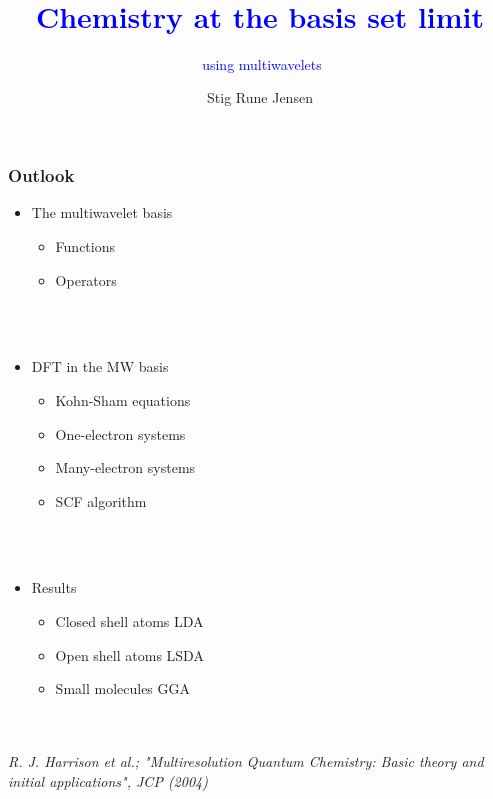 \documentclass[slides]{beamer}
\title{$\;$\\$\;$\\$\;$\\$\;$\\\textcolor{blue}
							{Chemistry at the basis set limit}}
\subtitle{$\;$\textcolor{blue}
							{using multiwavelets}}
\author{Stig Rune Jensen}
\begin{document}
\footnotesize

{
\maketitle
}

\begin{frame}
	\frametitle{Outlook}
	\begin{itemize}
		\item The multiwavelet basis
		\begin{itemize}
			\scriptsize
			\item Functions
			\item Operators
		\end{itemize}
		\ \\
		\ \\
		\item DFT in the MW basis
		\begin{itemize}
			\scriptsize
			\item Kohn-Sham equations
			\item One-electron systems
			\item Many-electron systems
			\item SCF algorithm
		\end{itemize}
		\ \\
		\ \\
		\item Results
		\begin{itemize}
			\scriptsize
			\item Closed shell atoms LDA
			\item Open shell atoms LSDA
			\item Small molecules GGA
		\end{itemize}
	\end{itemize}
	\ \\
	\ \\
	\tiny
	\it{R. J. Harrison et al.; "Multiresolution Quantum Chemistry: Basic theory and initial 
	    applications", JCP (2004)}
\end{frame}
\end{document}
